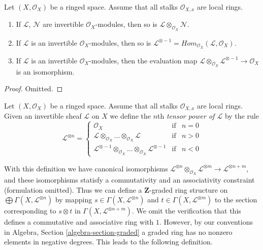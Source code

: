 \begin{lemma}
\label{lemma-constructions-invertible}
Let $(X, \mathcal{O}_X)$ be a ringed space.
Assume that all stalks $\mathcal{O}_{X, x}$ are local rings.
\begin{enumerate}
\item If $\mathcal{L}$, $\mathcal{N}$ are invertible
$\mathcal{O}_X$-modules, then so is
$\mathcal{L} \otimes_{\mathcal{O}_X} \mathcal{N}$.
\item If $\mathcal{L}$ is an invertible
$\mathcal{O}_X$-modules, then so is
$\mathcal{L}^{\otimes -1}
= \textit{Hom}_{\mathcal{O}_X}(\mathcal{L}, \mathcal{O}_X)$.
\item If $\mathcal{L}$ is an invertible
$\mathcal{O}_X$-modules, then the evaluation map
$\mathcal{L} \otimes_{\mathcal{O}_X} \mathcal{L}^{\otimes -1}
\to \mathcal{O}_X$ is an isomorphism.
\end{enumerate}
\end{lemma}

\begin{proof}
Omitted.
\end{proof}

\begin{definition}
\label{definition-powers}
Let $(X, \mathcal{O}_X)$ be a ringed space.
Assume that all stalks $\mathcal{O}_{X, x}$ are local rings.
Given an invertible sheaf $\mathcal{L}$ on $X$ we define
the $n$th {\it tensor power of $\mathcal{L}$} by the rule
$$
\mathcal{L}^{\otimes n} =
\left\{
\begin{matrix}
\mathcal{O}_X & \text{if} & n = 0 \\
\mathcal{L} \otimes_{\mathcal{O}_X} \ldots \otimes_{\mathcal{O}_X} \mathcal{L}
& \text{if} & n > 0 \\
\mathcal{L}^{\otimes -1} \otimes_{\mathcal{O}_X} \ldots
\otimes_{\mathcal{O}_X} \mathcal{L}^{\otimes -1}
& \text{if} & n < 0
\end{matrix}
\right.
$$
\end{definition}

\noindent
With this definition we have canonical isomorphisms
$\mathcal{L}^{\otimes n} \otimes_{\mathcal{O}_X}
\mathcal{L}^{\otimes m} \to
\mathcal{L}^{\otimes n + m}$, and these isomorphisms
statisfy a commutativity and an associativity constraint
(formulation omitted). Thus we can define a $\mathbf{Z}$-graded
ring structure on
$\bigoplus \Gamma(X, \mathcal{L}^{\otimes n})$ by mapping
$s \in \Gamma(X, \mathcal{L}^{\otimes n})$ and
$t \in \Gamma(X, \mathcal{L}^{\otimes m})$ to the
section corresponding to $s \otimes t$ in
$\Gamma(X, \mathcal{L}^{\otimes n + m})$.
We omit the verification that this defines a commutative
and associative ring with $1$. However, by our conventions in
Algebra, Section \ref{algebra-section-graded}
a graded ring has no nonzero elements in negative degrees.
This leads to the following definition.

